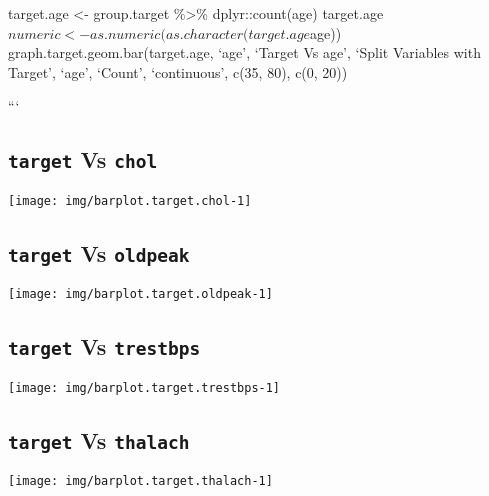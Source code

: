 \documentclass[]{article}
\begin{document}
target.age \textless{}- group.target \%\textgreater{}\%
dplyr::count(age)
target.age\(numeric <- as.numeric(as.character(target.age\)age))
graph.target.geom.bar(target.age, `age', `Target Vs age', `Split
Variables with Target', `age', `Count', `continuous', c(35, 80), c(0,
20))

```

\hypertarget{target-vs-chol}{%
\subsection{\texorpdfstring{\texttt{target} Vs
\texttt{chol}}{target Vs chol}}\label{target-vs-chol}}

\begin{center}\texttt{[image: img/barplot.target.chol-1]} \end{center}

\hypertarget{target-vs-oldpeak}{%
\subsection{\texorpdfstring{\texttt{target} Vs
\texttt{oldpeak}}{target Vs oldpeak}}\label{target-vs-oldpeak}}

\begin{center}\texttt{[image: img/barplot.target.oldpeak-1]} \end{center}

\hypertarget{target-vs-trestbps}{%
\subsection{\texorpdfstring{\texttt{target} Vs
\texttt{trestbps}}{target Vs trestbps}}\label{target-vs-trestbps}}

\begin{center}\texttt{[image: img/barplot.target.trestbps-1]} \end{center}

\hypertarget{target-vs-thalach}{%
\subsection{\texorpdfstring{\texttt{target} Vs
\texttt{thalach}}{target Vs thalach}}\label{target-vs-thalach}}

\begin{center}\texttt{[image: img/barplot.target.thalach-1]} \end{center}
\end{document}
